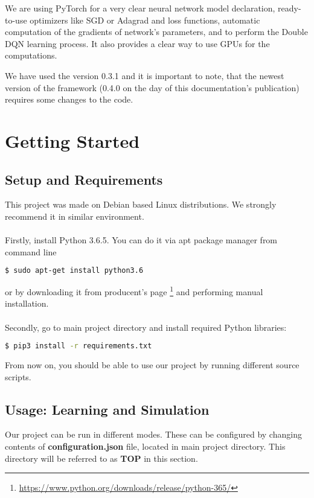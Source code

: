 \documentclass{article}
\begin{document}
We are using PyTorch for a very clear neural network model declaration, ready-to-use optimizers like SGD or Adagrad and loss functions, automatic computation of the gradients of network's parameters, and to perform the Double DQN learning process. It also provides a clear way to use GPUs for the computations. 

We have used the version 0.3.1 and it is important to note, that the newest version of the framework (0.4.0 on the day of this documentation's publication) requires some changes to the code.
\section{Getting Started}
\subsection{Setup and Requirements}
This project was made on Debian based Linux distributions. We strongly 
recommend it in similar environment. 
\\\\
Firstly, install Python 3.6.5. You can do it via apt package manager from command line
\begin{lstlisting}[language=bash]
$ sudo apt-get install python3.6 
\end{lstlisting}
or by downloading it from producent's page
\footnote{\url{https://www.python.org/downloads/release/python-365/}}
 and performing manual installation.
\\ \\ 
Secondly, go to main project directory and install required Python libraries:
\begin{lstlisting}[language=bash]
$ pip3 install -r requirements.txt
\end{lstlisting}
From now on, you should be able to use our project by running different source scripts.

\subsection{Usage: Learning and Simulation}
Our project can be run in different modes. These can be configured by changing contents of 
\textbf{configuration.json} file, located in main project directory. This directory will be referred to as 
\textbf{TOP} in this section. 
\end{document}
